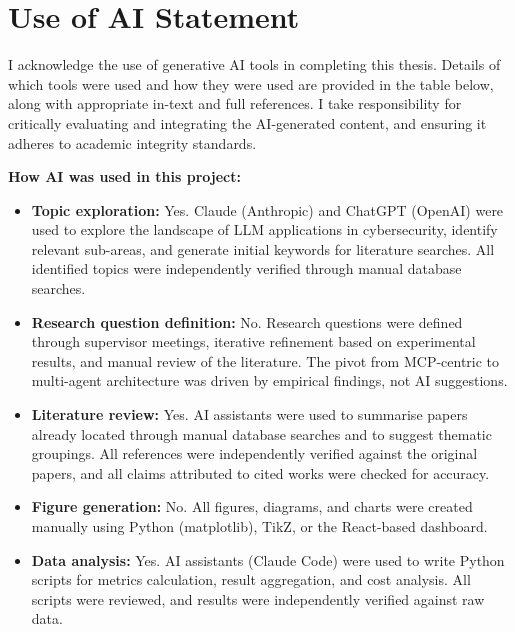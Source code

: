 \documentclass[../main.tex]{subfiles}
\begin{document}
\chapter{Use of AI Statement}

I acknowledge the use of generative AI tools in completing this thesis. Details of which tools were used and how they were used are provided in the table below, along with appropriate in-text and full references. I take responsibility for critically evaluating and integrating the AI-generated content, and ensuring it adheres to academic integrity standards.
\bigskip

\noindent\textbf{How AI was used in this project:}

\begin{itemize}[leftmargin=1.5em]
  \item \textbf{Topic exploration:} Yes. Claude (Anthropic) and ChatGPT (OpenAI) were used to explore the landscape of LLM applications in cybersecurity, identify relevant sub-areas, and generate initial keywords for literature searches. All identified topics were independently verified through manual database searches.

  \item \textbf{Research question definition:} No. Research questions were defined through supervisor meetings, iterative refinement based on experimental results, and manual review of the literature. The pivot from MCP-centric to multi-agent architecture was driven by empirical findings, not AI suggestions.

  \item \textbf{Literature review:} Yes. AI assistants were used to summarise papers already located through manual database searches and to suggest thematic groupings. All references were independently verified against the original papers, and all claims attributed to cited works were checked for accuracy.

  \item \textbf{Figure generation:} No. All figures, diagrams, and charts were created manually using Python (matplotlib), TikZ, or the React-based dashboard.

  \item \textbf{Data analysis:} Yes. AI assistants (Claude Code) were used to write Python scripts for metrics calculation, result aggregation, and cost analysis. All scripts were reviewed, and results were independently verified against raw data.


\end{itemize}
\end{document}
